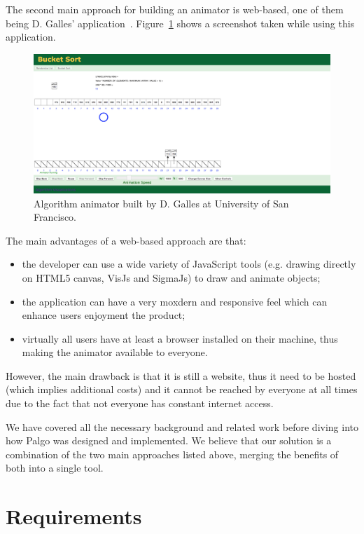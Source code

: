 \documentclass{l4proj}
\begin{document}
The second main approach for building an animator is web-based, one of them being D. Galles'
application~\cite{galles}. Figure~\ref{fig:galles} shows a screenshot taken while using this application.

\begin{figure}[!ht]
\centering
\includegraphics[scale=0.25]{galles}
\caption{Algorithm animator built by D. Galles at University of San Francisco.}
\label{fig:galles}
\end{figure}

The main advantages of a web-based approach are  that:
\begin{itemize}
\item the developer can use a wide variety of JavaScript tools (e.g. drawing directly on HTML5 canvas, VisJs and SigmaJs)
  to draw and animate objects;
\item the application can have a very moxdern and responsive feel which can enhance users enjoyment the product;
\item virtually all users have at least a browser installed on their machine, thus making the animator available to
  everyone.
\end{itemize}

However, the main drawback is that it is still a website, thus it need to be hosted (which implies additional costs) and it cannot be reached by everyone at all times due to the fact that not everyone has constant internet access.

We have covered all the necessary background and related work before diving into how Palgo was designed and implemented. We believe that our solution is a combination of the two main approaches listed above, merging the benefits of both into a single tool.


\chapter{Requirements}
\label{requirements}
\end{document}
